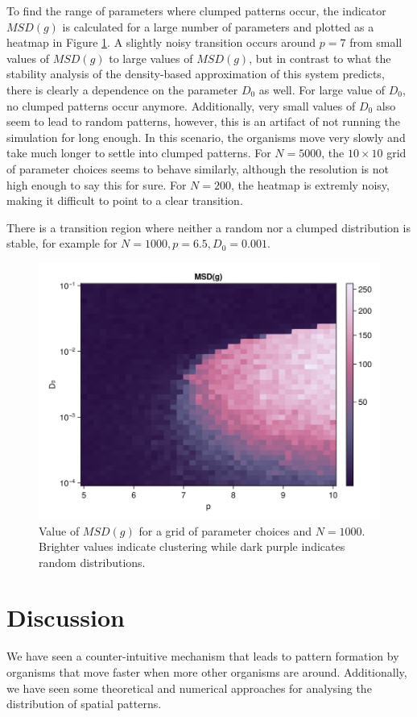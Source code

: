 \documentclass{article}
\begin{document}
To find the range of parameters where clumped patterns occur, the indicator $MSD(g)$ is calculated for a large number of parameters and plotted as a heatmap in Figure \ref{heatmap1000}. 
A slightly noisy transition occurs around $p=7$ from small values of $MSD(g)$ to large values of $MSD(g)$, but in contrast to what the stability analysis of the density-based approximation of this system predicts, there is clearly a dependence on the parameter $D_0$ as well. 
For large value of $D_0$, no clumped patterns occur anymore.
Additionally, very small values of $D_0$ also seem to lead to random patterns, however, this is an artifact of not running the simulation for long enough. 
In this scenario, the organisms move very slowly and take much longer to settle into clumped patterns.
For $N=5000$, the $10\times10$ grid of parameter choices seems to behave similarly, although the resolution is not high enough to say this for sure.
For $N=200$, the heatmap is extremly noisy, making it difficult to point to a clear transition.

There is a transition region where neither a random nor a clumped distribution is stable, for example for $N=1000, p=6.5, D_0=0.001$.
\begin{figure}
    \includegraphics[width=0.8\linewidth]{img/hm1.png}
    \caption{Value of $MSD(g)$ for a grid of parameter choices and $N=1000$. Brighter values indicate clustering while dark purple indicates random distributions. } 
    \label{heatmap1000}
\end{figure}

\section{Discussion}
We have seen a counter-intuitive mechanism that leads to pattern formation by organisms that move faster when more other organisms are around.
Additionally, we have seen some theoretical and numerical approaches for analysing the distribution of spatial patterns. 
\end{document}
